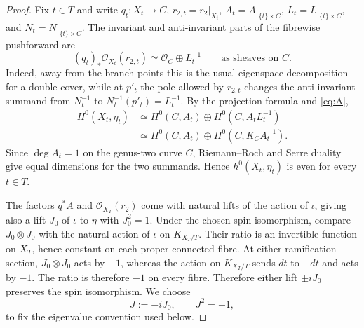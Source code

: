 \documentclass[11pt,a4paper,dvipsnames]{amsart}
\numberwithin{equation}{section}
\theoremstyle{plain}
\theoremstyle{definition}
\newcommand{\cO}{\mathcal O}
\begin{document}
\begin{proof}
Fix $t\in T$ and write
$q_t:X_t\to C$, $r_{2,t}=r_2|_{X_t}$,
$A_t=A|_{\{t\}\times C}$, $L_t=L|_{\{t\}\times C}$, and
$N_t=N|_{\{t\}\times C}$.
The invariant and anti-invariant parts of the fibrewise pushforward are
\begin{equation}\label{eq:fibre-pushforward-r2}
 (q_t)_*\cO_{X_t}(r_{2,t})
 \simeq\cO_C\oplus L_t^{-1}
 \qquad\text{as sheaves on }C.
\end{equation}
Indeed, away from the branch points this is the usual eigenspace
decomposition for a double cover, while at $p'_t$ the pole allowed by
$r_{2,t}$ changes the anti-invariant summand from $N_t^{-1}$ to
$N_t^{-1}(p'_t)=L_t^{-1}$.
By the projection formula and \eqref{eq:A},
\begin{align*}
 H^0(X_t,\eta_t)
 &\simeq H^0(C,A_t)\oplus H^0(C,A_tL_t^{-1})\\
 &\simeq H^0(C,A_t)\oplus H^0(C,K_C A_t^{-1}).
\end{align*}
Since $\deg A_t=1$ on the genus-two curve $C$, Riemann--Roch and Serre
duality give equal dimensions for the two summands.  Hence
$h^0(X_t,\eta_t)$ is even for every $t\in T$.

The factors $q^*A$ and $\cO_{X_T}(r_2)$ come with natural lifts of the action 
of $\iota$, giving also a lift $J_0$ of $\iota$ to $\eta$ with $J_0^2=1$.
Under the chosen spin isomorphism, compare $J_0\otimes J_0$
with the natural action of $\iota$ on $K_{X_T/T}$.  Their ratio is an
invertible function on $X_T$, hence constant on each proper connected
fibre.  At either ramification section, $J_0\otimes J_0$ acts by $+1$,
whereas the action on $K_{X_T/T}$ sends $dt$ to $-dt$ and acts by $-1$.
The ratio is therefore $-1$ on every fibre.  Therefore either lift
$\pm iJ_0$ preserves the spin isomorphism.  We choose
$$
 J:=-iJ_0,
 \qquad J^2=-1,
$$
to fix the eigenvalue convention used below.
\end{proof}
\end{document}
